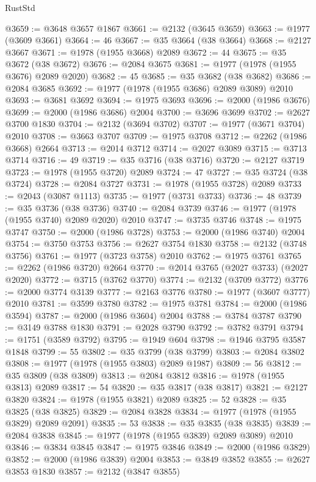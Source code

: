 \begin{lexlean}{RustStd}
\begin{coremodule}
@3659 := @3648 @3657 @1867
@3661 := @2132 (@3645 @3659)
@3663 := @1977 (@3609 @3661)
@3664 := 46
@3667 := @35 @3664 (@38 @3664)
@3668 := @2127 @3667
@3671 := @1978 (@1955 @3668) @2089
@3672 := 44
@3675 := @35 @3672 (@38 @3672)
@3676 := @2084 @3675
@3681 := @1977 (@1978 (@1955 @3676) @2089 @2020)
@3682 := 45
@3685 := @35 @3682 (@38 @3682)
@3686 := @2084 @3685
@3692 := @1977 (@1978 (@1955 @3686) @2089 @3089) @2010
@3693 := @3681 @3692
@3694 := @1975 @3693
@3696 := @2000 (@1986 @3676)
@3699 := @2000 (@1986 @3686) @2004
@3700 := @3696 @3699
@3702 := @2627 @3700 @1830
@3704 := @2132 (@3694 @3702)
@3707 := @1977 (@3671 @3704) @2010
@3708 := @3663 @3707
@3709 := @1975 @3708
@3712 := @2262 (@1986 @3668) @2664
@3713 := @2014 @3712
@3714 := @2027 @3089
@3715 := @3713 @3714
@3716 := 49
@3719 := @35 @3716 (@38 @3716)
@3720 := @2127 @3719
@3723 := @1978 (@1955 @3720) @2089
@3724 := 47
@3727 := @35 @3724 (@38 @3724)
@3728 := @2084 @3727
@3731 := @1978 (@1955 @3728) @2089
@3733 := @2043 (@3087 @1113)
@3735 := @1977 (@3731 @3733)
@3736 := 48
@3739 := @35 @3736 (@38 @3736)
@3740 := @2084 @3739
@3746 := @1977 (@1978 (@1955 @3740) @2089 @2020) @2010
@3747 := @3735 @3746
@3748 := @1975 @3747
@3750 := @2000 (@1986 @3728)
@3753 := @2000 (@1986 @3740) @2004
@3754 := @3750 @3753
@3756 := @2627 @3754 @1830
@3758 := @2132 (@3748 @3756)
@3761 := @1977 (@3723 @3758) @2010
@3762 := @1975 @3761
@3765 := @2262 (@1986 @3720) @2664
@3770 := @2014 @3765 (@2027 @3733) (@2027 @2020)
@3772 := @3715 (@3762 @3770)
@3774 := @2132 (@3709 @3772)
@3776 := @2000 @3774 @3139
@3777 := @2163 @3776
@3780 := @1977 (@3607 @3777) @2010
@3781 := @3599 @3780
@3782 := @1975 @3781
@3784 := @2000 (@1986 @3594)
@3787 := @2000 (@1986 @3604) @2004
@3788 := @3784 @3787
@3790 := @3149 @3788 @1830
@3791 := @2028 @3790
@3792 := @3782 @3791
@3794 := @1751 (@3589 @3792)
@3795 := @1949 @604
@3798 := @1946 @3795 @3587 @1848
@3799 := 55
@3802 := @35 @3799 (@38 @3799)
@3803 := @2084 @3802
@3808 := @1977 (@1978 (@1955 @3803) @2089 @1987)
@3809 := 56
@3812 := @35 @3809 (@38 @3809)
@3813 := @2084 @3812
@3816 := @1978 (@1955 @3813) @2089
@3817 := 54
@3820 := @35 @3817 (@38 @3817)
@3821 := @2127 @3820
@3824 := @1978 (@1955 @3821) @2089
@3825 := 52
@3828 := @35 @3825 (@38 @3825)
@3829 := @2084 @3828
@3834 := @1977 (@1978 (@1955 @3829) @2089 @2091)
@3835 := 53
@3838 := @35 @3835 (@38 @3835)
@3839 := @2084 @3838
@3845 := @1977 (@1978 (@1955 @3839) @2089 @3089) @2010
@3846 := @3834 @3845
@3847 := @1975 @3846
@3849 := @2000 (@1986 @3829)
@3852 := @2000 (@1986 @3839) @2004
@3853 := @3849 @3852
@3855 := @2627 @3853 @1830
@3857 := @2132 (@3847 @3855)

\end{coremodule}
\end{lexlean}
